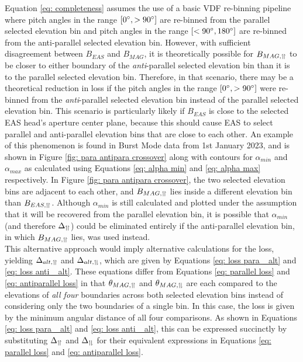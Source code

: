 Equation \ref{eq: completeness} assumes the use of a basic VDF re-binning pipeline where pitch angles in the range \([0\degree,>90\degree]\) are re-binned from the parallel selected elevation bin and pitch angles in the range \([<90\degree,180\degree]\) are re-binned from the anti-parallel selected elevation bin. However, with sufficient disagreement between \(B_{EAS}\) and \(B_{MAG}\), it is theoretically possible for \(B_{MAG, \upharpoonleft \! \upharpoonright}\) to be closer to either boundary of the \textit{anti}-parallel selected elevation bin than it is to the parallel selected elevation bin. Therefore, in that scenario, there may be a theoretical reduction in loss if the pitch angles in the range \([0\degree,>90\degree]\) were re-binned from the \textit{anti}-parallel selected elevation bin instead of the parallel selected elevation bin. This scenario is particularly likely if \(B_{EAS}\) is close to the selected EAS head's aperture center plane, because this should cause EAS to select parallel and anti-parallel elevation bins that are close to each other. An example of this phenomenon is found in Burst Mode data from 1st January 2023, and is shown in Figure \ref{fig: para antipara crossover} along with contours for \(\alpha_{min}\) and \(\alpha_{max}\) as calculated using Equations \ref{eq: alpha min} and \ref{eq: alpha max} respectively. In Figure \ref{fig: para antipara crossover}, the two selected elevation bins are adjacent to each other, and \(B_{MAG, \upharpoonleft \! \upharpoonright}\) lies inside a different elevation bin than \(B_{EAS, \upharpoonleft \! \upharpoonright}\). Although \(\alpha_{min}\) is still calculated and plotted under the assumption that it will be recovered from the parallel elevation bin, it is possible that \(\alpha_{min}\) (and therefore \(\Delta_{\upharpoonleft \! \upharpoonright}\)) could be eliminated entirely if the anti-parallel elevation bin, in which \(B_{MAG, \upharpoonleft \! \upharpoonright}\) lies, was used instead.
\\

This alternative approach would imply alternative calculations for the loss, yielding \(\Delta_{alt, \upharpoonleft \! \upharpoonright}\) and \(\Delta_{alt, \upharpoonleft \! \downharpoonright}\), which are given by Equations \ref{eq: loss para _alt} and \ref{eq: loss anti _alt}.  These equations differ from Equations \ref{eq: parallel loss} and \ref{eq: antiparallel loss} in that \(\theta_{MAG, \upharpoonleft \! \upharpoonright}\) and \(\theta_{MAG, \upharpoonleft \! \downharpoonright}\) are each compared to the elevations of \textit{all four} boundaries across both selected elevation bins instead of considering only the two boundaries of a single bin. In this case, the loss is given by the minimum angular distance of all four comparisons. As shown in Equations \ref{eq: loss para _alt} and \ref{eq: loss anti _alt}, this can be expressed succinctly by substituting \(\Delta_{\upharpoonleft \! \upharpoonright}\) and \(\Delta_{\upharpoonleft \! \downharpoonright}\) for their equivalent expressions in Equations \ref{eq: parallel loss} and \ref{eq: antiparallel loss}.


